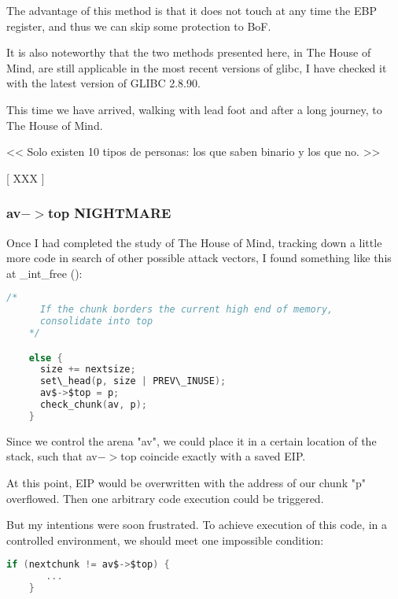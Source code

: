 \documentclass[12pt]{article}
\begin{document}
The advantage of this method is that it does not touch at any time the EBP
register, and thus we can skip some protection to BoF.
\newline


It is also noteworthy that the two methods presented here, in The House of
Mind, are still applicable in the most recent versions of glibc, I have
checked it with the latest version of GLIBC 2.8.90.
\newline


This time we have arrived, walking with lead foot and after a long
journey, to The House of Mind.


\begin{verbnobox}[\small]
                 << Solo existen 10 tipos de personas: los que
                    saben binario y los que no. >>

                                                       [ XXX ]

\end{verbnobox}

\subsubsection{av$->$top NIGHTMARE}



Once I had completed the study of The House of Mind, tracking down a
little more code in search of other possible attack vectors, I found
something like this at \_int\_free ():

\begin{lstlisting}[language=C]
    /*
      If the chunk borders the current high end of memory,
      consolidate into top
    */

    else {
      size += nextsize;
      set\_head(p, size | PREV\_INUSE);
      av$->$top = p;
      check_chunk(av, p);
    }
\end{lstlisting}

Since we control the arena "av", we could place it in a certain location
of the stack, such that av$->$top coincide exactly with a saved EIP.
\newline


At this point, EIP would be overwritten with the address of our chunk "p"
overflowed. Then one arbitrary code execution could be triggered.
\newline


But my intentions were soon frustrated. To achieve execution of this code,
in a controlled environment, we should meet one impossible condition:
\begin{lstlisting}[language=C]
    if (nextchunk != av$->$top) {
       ...
    }
\end{lstlisting}
\end{document}
